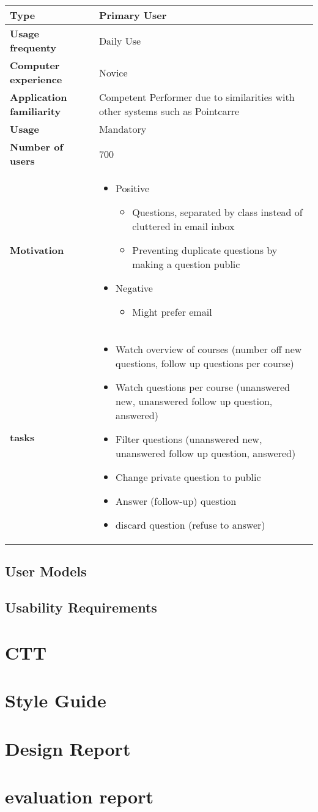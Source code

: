 \documentclass[10pt]{report}
\begin{document}
\begin{tabular}{ | l | p{10cm} |}
\hline
\textbf{Type} & Primary User \\ \hline
\textbf{Usage frequenty} & Daily Use \\ \hline
\textbf{Computer experience} & Novice \\ \hline
\textbf{Application familiarity} & Competent Performer due to similarities with other systems such as Pointcarre \\ \hline
\textbf{Usage} & Mandatory\\ \hline
\textbf{Number of users} & 700\\ \hline
\textbf{Motivation} & 
	\begin{itemize}
		\item Positive 
		\begin{itemize}
			\item Questions, separated by class instead of cluttered in email inbox
			\item Preventing duplicate questions by making a question public
		\end{itemize}
		\item Negative 
		\begin{itemize}
			\item Might prefer email
		\end{itemize}
	\end{itemize} \\ \hline
\textbf{tasks} & 
	\begin{itemize}
		\item Watch overview of courses (number off new questions, follow up questions per course)
		\item Watch questions per course (unanswered new, unanswered follow up question, answered)
		\item Filter questions (unanswered new, unanswered follow up question, answered)
		\item Change private question to public
		\item Answer (follow-up) question
		\item discard question (refuse to answer)
	\end{itemize} \\ \hline
\end{tabular}

\subsection{User Models}

\subsection{Usability Requirements}

\section{CTT}

\section{Style Guide}

\section{Design Report}

\section{evaluation report}
\end{document}
